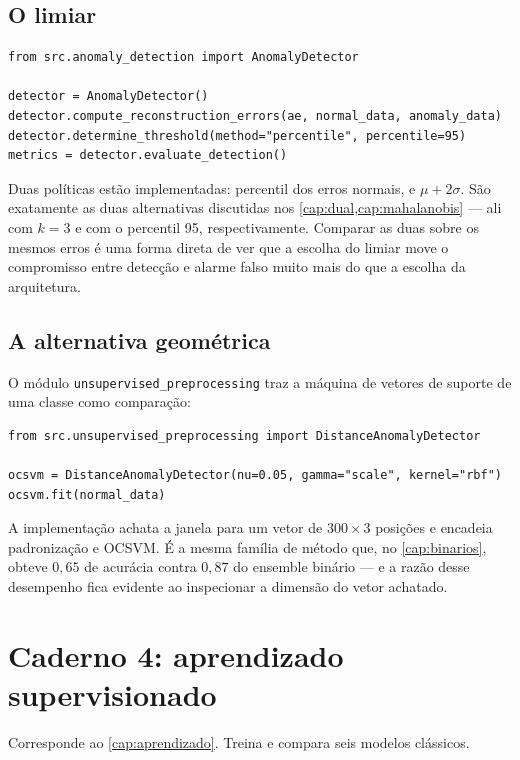 \subsection{O limiar}

\begin{lstlisting}
from src.anomaly_detection import AnomalyDetector

detector = AnomalyDetector()
detector.compute_reconstruction_errors(ae, normal_data, anomaly_data)
detector.determine_threshold(method="percentile", percentile=95)
metrics = detector.evaluate_detection()
\end{lstlisting}

Duas políticas estão implementadas: percentil dos erros normais, e $\mu + 2\sigma$. São
exatamente as duas alternativas discutidas nos \cref{cap:dual,cap:mahalanobis} --- ali com
$k = 3$ e com o percentil 95, respectivamente. Comparar as duas sobre os mesmos erros é
uma forma direta de ver que a escolha do limiar move o compromisso entre detecção e
alarme falso muito mais do que a escolha da arquitetura.

\subsection{A alternativa geométrica}

O módulo \texttt{unsupervised\_preprocessing} traz a máquina de vetores de suporte de uma
classe como comparação:

\begin{lstlisting}
from src.unsupervised_preprocessing import DistanceAnomalyDetector

ocsvm = DistanceAnomalyDetector(nu=0.05, gamma="scale", kernel="rbf")
ocsvm.fit(normal_data)
\end{lstlisting}

A implementação achata a janela para um vetor de $300 \times 3$ posições e encadeia
padronização e OCSVM. É a mesma família de método que, no \cref{cap:binarios}, obteve
$0{,}65$ de acurácia contra $0{,}87$ do ensemble binário --- e a razão desse desempenho
fica evidente ao inspecionar a dimensão do vetor achatado.

\section{Caderno 4: aprendizado supervisionado}

Corresponde ao \cref{cap:aprendizado}. Treina e compara seis modelos clássicos.

